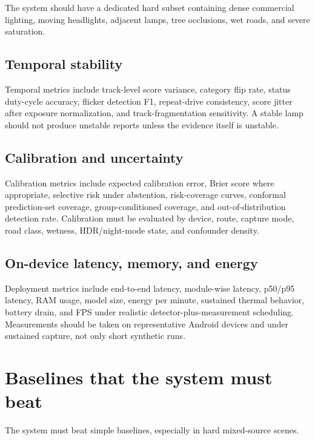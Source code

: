 \documentclass[11pt]{article}
\begin{document}
The system should have a dedicated hard subset containing dense commercial lighting, moving headlights, adjacent lamps, tree occlusions, wet roads, and severe saturation.

\subsection{Temporal stability}

Temporal metrics include track-level score variance, category flip rate, status duty-cycle accuracy, flicker detection F1, repeat-drive consistency, score jitter after exposure normalization, and track-fragmentation sensitivity. A stable lamp should not produce unstable reports unless the evidence itself is unstable.

\subsection{Calibration and uncertainty}

Calibration metrics include expected calibration error, Brier score where appropriate, selective risk under abstention, risk-coverage curves, conformal prediction-set coverage, group-conditioned coverage, and out-of-distribution detection rate. Calibration must be evaluated by device, route, capture mode, road class, wetness, HDR/night-mode state, and confounder density.

\subsection{On-device latency, memory, and energy}

Deployment metrics include end-to-end latency, module-wise latency, p50/p95 latency, RAM usage, model size, energy per minute, sustained thermal behavior, battery drain, and FPS under realistic detector-plus-measurement scheduling. Measurements should be taken on representative Android devices and under sustained capture, not only short synthetic runs.

\section{Baselines that the system must beat}

The system must beat simple baselines, especially in hard mixed-source scenes.
\end{document}
